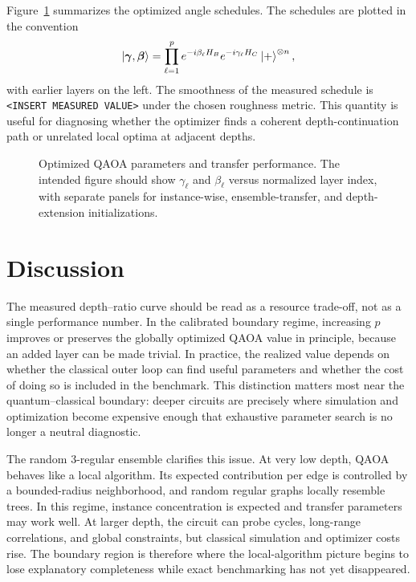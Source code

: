 \documentclass[reprint,aps,longbibliography]{revtex4-2}
\begin{document}
Figure~\ref{fig:parameters} summarizes the optimized angle schedules. The schedules are plotted in the convention
\begin{equation}
  \ket{\boldsymbol{\gamma},\boldsymbol{\beta}}
  =
  \prod_{\ell=1}^{p}
  e^{-i\beta_\ell H_B}
  e^{-i\gamma_\ell H_C}
  \ket{+}^{\otimes n},
\end{equation}
with earlier layers on the left. The smoothness of the measured schedule is \texttt{<INSERT MEASURED VALUE>} under the chosen roughness metric. This quantity is useful for diagnosing whether the optimizer finds a coherent depth-continuation path or unrelated local optima at adjacent depths.

\begin{figure}[t]
\centering
\caption{Optimized QAOA parameters and transfer performance. The intended figure should show $\gamma_\ell$ and $\beta_\ell$ versus normalized layer index, with separate panels for instance-wise, ensemble-transfer, and depth-extension initializations.}
\label{fig:parameters}
\end{figure}

\section{Discussion}

The measured depth--ratio curve should be read as a resource trade-off, not as a single performance number. In the calibrated boundary regime, increasing $p$ improves or preserves the globally optimized QAOA value in principle, because an added layer can be made trivial. In practice, the realized value depends on whether the classical outer loop can find useful parameters and whether the cost of doing so is included in the benchmark. This distinction matters most near the quantum--classical boundary: deeper circuits are precisely where simulation and optimization become expensive enough that exhaustive parameter search is no longer a neutral diagnostic.

The random 3-regular ensemble clarifies this issue. At very low depth, QAOA behaves like a local algorithm. Its expected contribution per edge is controlled by a bounded-radius neighborhood, and random regular graphs locally resemble trees. In this regime, instance concentration is expected and transfer parameters may work well. At larger depth, the circuit can probe cycles, long-range correlations, and global constraints, but classical simulation and optimizer costs rise. The boundary region is therefore where the local-algorithm picture begins to lose explanatory completeness while exact benchmarking has not yet disappeared.
\end{document}
